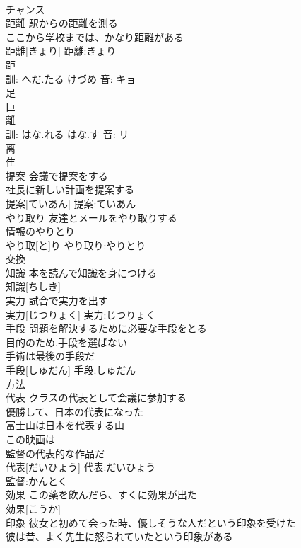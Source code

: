 \documentclass[8pt]{extreport}
\begin{document}
\begin{CJK}{UTF8}{min}
\\	チャンス 
\\	距離	駅からの距離を測る 
\\	ここから学校までは、かなり距離がある 
\\	距離[きょり]			距離:きょり
\\	距 
\\	訓: へだ.たる けづめ 音: キョ 
\\	足 
\\	巨 
\\	離 
\\	訓: はな.れる はな.す 音: リ 
\\	离 
\\	隹 
\\	提案	会議で提案をする 
\\	社長に新しい計画を提案する 
\\	提案[ていあん]			提案:ていあん
\\	やり取り	友達とメールをやり取りする 
\\	情報のやりとり 
\\	やり取[と]り			やり取り:やりとり
\\	交換 
\\	知識	本を読んで知識を身につける 
\\	知識[ちしき]						
\\	実力	試合で実力を出す 
\\	実力[じつりょく]			実力:じつりょく
\\	手段	問題を解決するために必要な手段をとる 
\\	目的のため,手段を選ばない 
\\	手術は最後の手段だ 
\\	手段[しゅだん]			手段:しゅだん
\\	方法 
\\	代表	クラスの代表として会議に参加する 
\\	優勝して、日本の代表になった 
\\	富士山は日本を代表する山 
\\	この映画は
\\	監督の代表的な作品だ 
\\	代表[だいひょう]			代表:だいひょう
\\	監督:かんとく
\\	効果	この薬を飲んだら、すくに効果が出た 
\\	効果[こうか]						
\\	印象	彼女と初めて会った時、優しそうな人だという印象を受けた 
\\	彼は昔、よく先生に怒られていたという印象がある 

\end{CJK}
\end{document}

